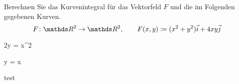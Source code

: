 \begin{atiTask}[
  title = Wegintegrale berechnen
]
  Berechnen Sie das Kurvenintegral für das Vektorfeld $F$ und die im Folgenden gegebenen Kurven.
  \[
    \function{F}{\setR^2}{\setR^2}
    \separate
    F(x,y)\define (x^2+y^2)\vec{i} + 4xy\vec{j}
  \]
  \begin{atiSubequations}
    \item{
      2y = x^2
    }
    \item{
      y = x
    }
    \item{
      test
    }
  \end{atiSubequations}
\end{atiTask}